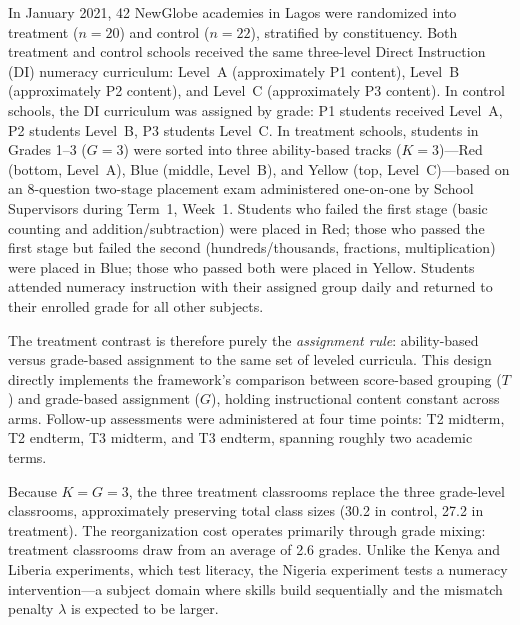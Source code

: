 \documentclass[11pt]{article}
\begin{document}
In January 2021, 42 NewGlobe academies in Lagos were randomized into treatment ($n = 20$) and control ($n = 22$), stratified by constituency. Both treatment and control schools received the same three-level Direct Instruction (DI) numeracy curriculum: Level~A (approximately P1 content), Level~B (approximately P2 content), and Level~C (approximately P3 content). In control schools, the DI curriculum was assigned by grade: P1 students received Level~A, P2 students Level~B, P3 students Level~C. In treatment schools, students in Grades 1--3 ($G = 3$) were sorted into three ability-based tracks ($K = 3$)---Red (bottom, Level~A), Blue (middle, Level~B), and Yellow (top, Level~C)---based on an 8-question two-stage placement exam administered one-on-one by School Supervisors during Term~1, Week~1. Students who failed the first stage (basic counting and addition/subtraction) were placed in Red; those who passed the first stage but failed the second (hundreds/thousands, fractions, multiplication) were placed in Blue; those who passed both were placed in Yellow. Students attended numeracy instruction with their assigned group daily and returned to their enrolled grade for all other subjects.

The treatment contrast is therefore purely the \emph{assignment rule}: ability-based versus grade-based assignment to the same set of leveled curricula. This design directly implements the framework's comparison between score-based grouping ($T$) and grade-based assignment ($G$), holding instructional content constant across arms. Follow-up assessments were administered at four time points: T2 midterm, T2 endterm, T3 midterm, and T3 endterm, spanning roughly two academic terms.

Because $K = G = 3$, the three treatment classrooms replace the three grade-level classrooms, approximately preserving total class sizes (30.2 in control, 27.2 in treatment). The reorganization cost operates primarily through grade mixing: treatment classrooms draw from an average of 2.6 grades. Unlike the Kenya and Liberia experiments, which test literacy, the Nigeria experiment tests a numeracy intervention---a subject domain where skills build sequentially and the mismatch penalty $\lambda$ is expected to be larger.
\end{document}
